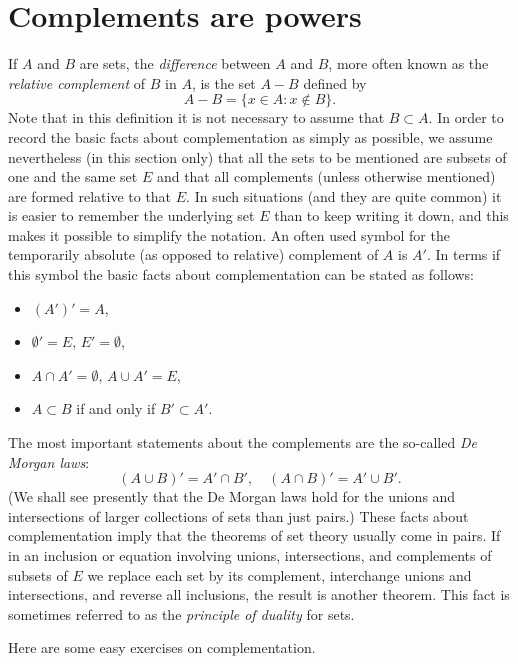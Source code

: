 \section{Complements are powers}

If $A$ and $B$ are sets, the \textit{difference} between $A$ and $B$, more often known as the \textit{relative complement} of $B$ in $A$, is the set $A - B$ defined by
\[
	A - B = \{ x \in A : x \not \in B\}.
\]
Note that in this definition it is not necessary to assume that $B \subset A$. In order to record the basic facts about complementation as simply as possible, we assume nevertheless (in this section only) that all the sets to be mentioned are subsets of one and the same set $E$ and that all complements (unless otherwise mentioned) are formed relative to that $E$. In such situations (and they are quite common) it is easier to remember the underlying set $E$ than to keep writing it down, and this makes it possible to simplify the notation. An often used symbol for the temporarily absolute (as opposed to relative) complement of $A$ is $A'$. In terms if this symbol the basic facts about complementation can be stated as follows:

\begin{itemize}
	\item $(A')' = A$,
	\item $\emptyset' = E, \, E' = \emptyset$,
	\item $A \cap A' = \emptyset, \, A \cup A' = E$,
	\item $A \subset B$ if and only if $B' \subset A'$.
\end{itemize}

The most important statements about the complements are the so-called \textit{De Morgan laws}:
\[
	(A \cup B)' = A' \cap B', \quad (A \cap B)' = A' \cup B'.
\]
(We shall see presently that the De Morgan laws hold for the unions and intersections of larger collections of sets than just pairs.) These facts about complementation imply that the theorems of set theory usually come in pairs. If in an inclusion or equation involving unions, intersections, and complements of subsets of $E$ we replace each set by its complement, interchange unions and intersections, and reverse all inclusions, the result is another theorem. This fact is sometimes referred to as the \textit{principle of duality} for sets.

Here are some easy exercises on complementation.

